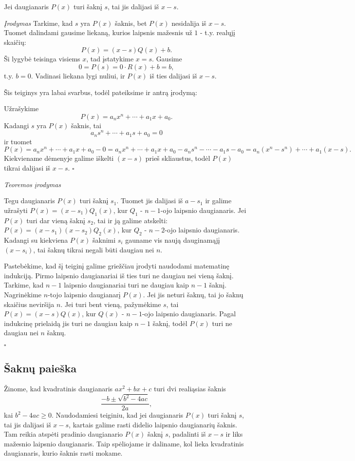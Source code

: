 \begin{teig}
Jei daugianaris $P(x)$ turi šaknį $s$, tai jis dalijasi iš $x-s$. 
\end{teig}

\emph{Įrodymas} Tarkime, kad $s$ yra $P(x)$ šaknis, bet $P(x)$ nesidalija
iš $x-s$. Tuomet dalindami gausime liekaną, kurios laipsnis mažesnis už $1$
- t.y. realųjį skaičių: $$P(x) = (x-s)Q(x) + b.$$ Ši lygybė teisinga
visiems $x$, tad įstatykime $x=s$. Gausime $$0=P(s) = 0\cdot R(x) + b =
b,$$ t.y. $b=0$. Vadinasi liekana lygi nuliui, ir $P(x)$ iš ties dalijasi
iš $x-s$.

Šis teiginys yra labai svarbus, todėl pateiksime ir antrą įrodymą:

Užrašykime $$P(x) = a_nx^n + \cdots + a_1x +a_0.$$ Kadangi $s$ yra $P(x)$
šaknis, tai $$a_ns^n + \cdots + a_1s +a_0 = 0$$ ir tuomet $$P(x) = a_nx^n +
\cdots + a_1x +a_0 - 0 = a_nx^n + \cdots + a_1x +a_0 - a_ns^n - \cdots -
a_1s -a_0 = a_n(x^n -s^n) + \cdots + a_1(x-s).$$ Kiekviename dėmenyje
galime iškelti $(x-s)$ prieš skliaustus, todėl $P(x)$ tikrai dalijasi iš
$x-s$. $\square$


\emph{Teoremos įrodymas}

Tegu daugianaris $P(x)$ turi šaknį $s_1$. Tuomet jis dalijasi iš $a-s_1$ ir
galime užrašyti $P(x)=(x-s_1)Q_1(x)$, kur $Q_1$ - $n-1$-ojo laipsnio
daugianaris. Jei $P(x)$ turi dar vieną šaknį $s_2$, tai ir ją galime
atskelti: $P(x) = (x-s_1)(x-s_2)Q_2(x)$, kur $Q_2$ - $n-2$-ojo laipsnio
daugianaris. Kadangi su kiekviena $P(x)$ šaknimi $s_i$ gauname vis naują
dauginamąjį $(x-s_i)$, tai šaknų tikrai negali būti daugiau nei $n$.


Pastebėkime, kad šį teiginį galime griežčiau įrodyti naudodami matematinę
indukciją. Pirmo laipsnio daugianariai iš ties turi ne daugiau nei vieną
šaknį. Tarkime, kad $n-1$ laipsnio daugianariai turi ne daugiau kaip $n-1$
šaknį. Nagrinėkime $n$-tojo laipsnio daugianarį $P(x)$. Jei jis neturi
šaknų, tai jo šaknų skaičius neviršija $n$. Jei turi bent vieną, pažymėkime
$s$, tai $P(x)=(x-s)Q(x)$, kur $Q(x)$ - $n-1$-ojo laipsnio daugianaris.
Pagal indukcinę prielaidą jis turi ne daugiau kaip $n-1$ šaknį, todėl
$P(x)$ turi ne daugiau nei $n$ šaknų.
 
$\square$
\bigskip

\subsection{Šaknų paieška} 

Žinome, kad kvadratinis daugianaris $ax^2 + bx + c$ turi dvi realiąsias
šaknis $$\frac{-b \pm \sqrt{b^2 - 4ac}}{2a},$$ kai $b^2-4ac\geq 0$. 
Naudodamiesi teiginiu, kad jei daugianaris $P(x)$ turi šaknį $s$, tai jis
dalijasi iš $x-s$, kartais galime rasti didelio laipsnio daugianarių
šaknis. Tam reikia atspėti pradinio daugianario $P(x)$ šaknį $s$, padalinti
iš $x-s$ ir liks mažesnio laipsnio daugianaris. Taip spėliojame ir
daliname, kol lieka kvadratinis daugianaris, kurio šaknis rasti mokame. 


